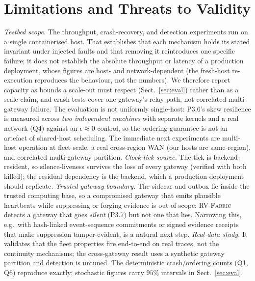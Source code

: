 \documentclass[runningheads]{llncs}
\newcommand{\sys}{\textsc{RV-Fabric}\xspace}
\begin{document}
\section{Limitations and Threats to Validity}
\label{sec:limits}
\emph{Testbed scope.} The throughput, crash-recovery, and detection experiments run on a
single containerised host. That establishes that each mechanism holds its stated invariant
under injected faults and that removing it reintroduces one specific failure; it does not
establish the absolute throughput or latency of a production deployment, whose figures are
host- and network-dependent (the fresh-host re-execution reproduces the behaviour, not the
numbers). We therefore report capacity as bounds a scale-out must respect
(Sect.~\ref{sec:eval}) rather than as a scale claim, and crash tests cover one gateway's
relay path, not correlated multi-gateway failure. The evaluation is not uniformly
single-host: P3.6's skew resilience is measured across \emph{two independent machines} with
separate kernels and a real network (Q4) against an $\epsilon{\approx}0$ control, so the
ordering guarantee is not an artefact of shared-host scheduling. The immediate next
experiments are multi-host operation at fleet scale, a real cross-region WAN (our hosts are
same-region), and correlated multi-gateway partition. \emph{Clock-tick source.} The tick is
backend-resident, so silence-liveness survives the loss of every gateway (verified with
both killed); the residual dependency is the backend, which a production deployment should
replicate. \emph{Trusted gateway boundary.} The sidecar and outbox lie inside the trusted
computing base, so a compromised gateway that emits plausible heartbeats while
suppressing or forging evidence is out of scope: \sys detects a gateway that goes
\emph{silent} (P3.7) but not one that lies. Narrowing this, e.g.\ with hash-linked
event-sequence commitments or signed evidence receipts that make suppression
tamper-evident, is a natural next step. \emph{Real-data study.} It validates that the
fleet properties fire end-to-end on real traces, not the continuity mechanisms; the
cross-gateway result uses a synthetic gateway partition and detection is untuned. The
deterministic crash/ordering counts (Q1, Q6) reproduce exactly; stochastic figures carry
$95\%$ intervals in Sect.~\ref{sec:eval}.

\end{document}
